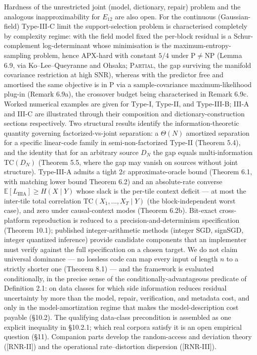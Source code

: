\documentclass[
]{article}
\begin{document}
Hardness of the unrestricted joint (model, dictionary, repair)
problem and the analogous inapproximability for $E_{12}$ are also
open. For the continuous (Gaussian-field) Type-III-C limit the
support-selection problem is characterised completely by complexity
regime: with the field model fixed the per-block residual is a
Schur-complement log-determinant whose minimisation is the
maximum-entropy-sampling problem, hence APX-hard with constant $5/4$
under $\mathrm{P} \neq \mathrm{NP}$ (Lemma 6.9, via Ko--Lee--Queyranne
and Ohsaka; \textsc{Partial}, the gap surviving the manifold
covariance restriction at high SNR), whereas with the predictor free
and amortised the same objective is in $\mathrm{P}$ via a
sample-covariance maximum-likelihood plug-in (Remark 6.9a), the
crossover budget being characterised in Remark 6.9c.
Worked numerical examples are
given for Type-I, Type-II, and Type-III-B; III-A and III-C are
illustrated through their composition and dictionary-construction
sections respectively. Two structural results identify the
information-theoretic quantity governing factorized-vs-joint
separation: a $\Theta(N)$ amortized separation for a specific
linear-code family in semi-non-factorized Type-II (Theorem 5.4), and
the identity that for an arbitrary source $D_N$ the gap equals
multi-information $\mathrm{TC}(D_N)$ (Theorem 5.5, where the gap may
vanish on sources without joint structure). Type-III-A admits a tight
$2\varepsilon$ approximate-oracle bound (Theorem 6.1, with matching
lower bound Theorem 6.2) and an absolute-rate converse
$\mathbb{E}[L_{\mathrm{IIIA}}]\ge H(X\mid Y)$ whose slack is the
per-tile context deficit --- at most the inter-tile total correlation
$\mathrm{TC}(X_1,\ldots,X_T\mid Y)$ (the block-independent worst case),
and zero under causal-context modes (Theorem 6.2b).
Bit-exact cross-platform reproduction is
reduced to a precision-and-determinism specification (Theorem 10.1);
published integer-arithmetic methods (integer SGD, signSGD, integer
quantized inference) provide candidate components that an implementer
must verify against the full specification on a chosen target. We do not claim universal
dominance --- no lossless code can map every input of length $n$ to a
strictly shorter one (Theorem 8.1) --- and the framework is evaluated
conditionally, in the precise sense of the conditionally-advantageous
predicate of Definition 2.1: on data classes for which side
information reduces residual uncertainty by more than the model,
repair, verification, and metadata cost, and only in the
model-amortization regime that makes the model-description cost
payable (§10.2). The qualifying data-class precondition is assembled
as one explicit inequality in §10.2.1; which real corpora satisfy it
is an open empirical question (§11). Companion parts develop the random-access and deviation theory ([RNR-II]) and the operational rate--distortion dispersion ([RNR-III]).
\end{document}
